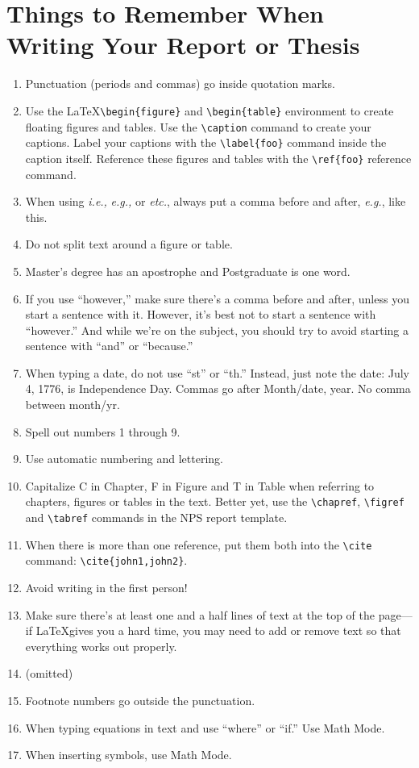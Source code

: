 
\section{Things to Remember When Writing Your Report or Thesis}
\begin{enumerate}
\item Punctuation (periods and commas) go inside quotation marks. 
\item Use the \LaTeX \verb+\begin{figure}+ and \verb+\begin{table}+ environment to
  create floating figures and tables. Use the \verb+\caption+ command
  to create your captions. Label your captions with the
  \verb+\label{foo}+ command inside the caption itself. Reference
  these figures and tables with the \verb+\ref{foo}+ reference command.
\item When using \emph{i.e.,} \emph{e.g.,} or \emph{etc.}, always put
  a comma before and after, \emph{e.g.}, like this.
\item Do not split text around a figure or table. 
\item Master's degree has an apostrophe and Postgraduate is one word. 
\item If you use ``however,'' make sure there's a comma before and after,
unless you 
start a sentence with it. However, it's best not to start a sentence
with ``however.'' And while we're on the subject, you should try to avoid starting a sentence with ``and'' or ``because.'' 
\item When typing a date, do not use ``st'' or ``th.'' Instead, just
  note the date: July 4, 1776, is Independence Day. Commas go 
after Month/date, year. No comma between month/yr. 
\item Spell out numbers 1 through 9. 
\item Use automatic numbering and lettering.
\item Capitalize C in Chapter, F in Figure and T in Table when referring
to chapters, 
figures or tables in the text. Better yet, use the \verb+\chapref+,
\verb+\figref+ and \verb+\tabref+ commands in the NPS report template.
\item When there is more than one reference, put them both into the \verb+\cite+ command: \verb+\cite{john1,john2}+.
\item Avoid writing in the first person!
\item Make sure there's at least one and a half lines of text at the
  top of the page---if \LaTeX gives you a hard time, you may need to
  add or remove text so that everything works out properly.
\item (omitted)
\item Footnote numbers go outside the punctuation. 
\item When typing equations in text and use ``where'' or ``if.'' Use
  Math Mode. 
\item When inserting symbols, use Math Mode.
\end{enumerate}

